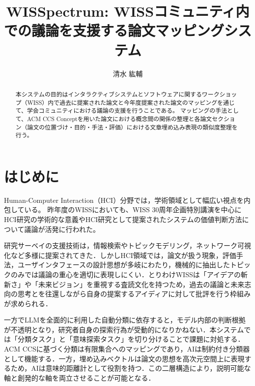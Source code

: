\documentclass[twoside]{wiss}
\begin{document}
\title{WISSpectrum: WISSコミュニティ内での議論を支援する論文マッピングシステム}
\author{清水 紘輔}

\begin{abstract}
本システムの目的はインタラクティブシステムとソフトウェアに関するワークショップ（WISS）内で過去に提案された論文と今年度提案された論文のマッピングを通じて、学会コミュニティにおける議論の支援を行うことである。
マッピングの手法として、ACM CCS Conceptを用いた論文における概念間の関係の整理と各論文セクション（論文の位置づけ・目的・手法・評価）における文章埋め込み表現の類似度整理を行う。

\end{abstract}

\maketitle

\section{はじめに}
Human-Computer Interaction（HCI）分野では，学術領域として幅広い視点を内包している。
昨年度のWISSにおいても、WISS 30周年企画特別講演を中心に\cite{wiss_special_lecture2024}HCI研究の学術的な意義やHCI研究として提案されたシステムの価値判断方法について議論が活発に行われた。

研究サーベイの支援技術は，情報検索やトピックモデリング，ネットワーク可視化など多様に提案されてきた．しかしHCI領域では，論文が扱う現象，評価手法，ユーザインタフェースの設計思想が多岐にわたり，機械的に抽出したトピックのみでは議論の重心を適切に表現しにくい．とりわけWISSは「アイデアの斬新さ」や「未来ビジョン」を重視する査読文化を持つため\cite{wiss_submission}，過去の議論と未来志向の思考とを往還しながら自身の提案するアイディアに対して批評を行う枠組みが求められる．

一方でLLMを全面的に利用した自動分類に依存すると，モデル内部の判断根拠が不透明となり，研究者自身の探索行為が受動的になりかねない．本システムでは「分類タスク」と「意味探索タスク」を切り分けることで課題に対処する．ACM CCSに基づく分類は有限集合へのマッピングであり，AIは制約付き分類器として機能する．一方，埋め込みベクトルは論文の思想を高次元空間上に表現するため，AIは意味的距離計として役割を持つ．この二層構造により，説明可能な軸と創発的な軸を両立させることが可能となる．
\end{document}
